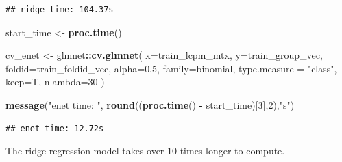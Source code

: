 \documentclass[
]{book}
\newenvironment{Shaded}{\begin{snugshade}}{\end{snugshade}}
\newcommand{\DataTypeTok}[1]{\textcolor[rgb]{0.13,0.29,0.53}{#1}}
\newcommand{\DecValTok}[1]{\textcolor[rgb]{0.00,0.00,0.81}{#1}}
\newcommand{\FloatTok}[1]{\textcolor[rgb]{0.00,0.00,0.81}{#1}}
\newcommand{\KeywordTok}[1]{\textcolor[rgb]{0.13,0.29,0.53}{\textbf{#1}}}
\newcommand{\NormalTok}[1]{#1}
\newcommand{\OperatorTok}[1]{\textcolor[rgb]{0.81,0.36,0.00}{\textbf{#1}}}
\newcommand{\StringTok}[1]{\textcolor[rgb]{0.31,0.60,0.02}{#1}}
\begin{document}
\begin{verbatim}
## ridge time: 104.37s
\end{verbatim}

\begin{Shaded}
\begin{Highlighting}[]
\NormalTok{start\_time <{-}}\StringTok{  }\KeywordTok{proc.time}\NormalTok{()}

\NormalTok{cv\_enet <{-}}\StringTok{ }\NormalTok{glmnet}\OperatorTok{::}\KeywordTok{cv.glmnet}\NormalTok{(}
 \DataTypeTok{x=}\NormalTok{train\_lcpm\_mtx,}
 \DataTypeTok{y=}\NormalTok{train\_group\_vec,}
 \DataTypeTok{foldid=}\NormalTok{train\_foldid\_vec,}
 \DataTypeTok{alpha=}\FloatTok{0.5}\NormalTok{,}
 \DataTypeTok{family=}\StringTok{\textquotesingle{}binomial\textquotesingle{}}\NormalTok{,}
 \DataTypeTok{type.measure =} \StringTok{"class"}\NormalTok{,}
 \DataTypeTok{keep=}\NormalTok{T,}
 \DataTypeTok{nlambda=}\DecValTok{30}
\NormalTok{)}

\KeywordTok{message}\NormalTok{(}\StringTok{"enet time: "}\NormalTok{, }\KeywordTok{round}\NormalTok{((}\KeywordTok{proc.time}\NormalTok{() }\OperatorTok{{-}}\StringTok{ }\NormalTok{start\_time)[}\DecValTok{3}\NormalTok{],}\DecValTok{2}\NormalTok{),}\StringTok{"s"}\NormalTok{)}
\end{Highlighting}
\end{Shaded}

\begin{verbatim}
## enet time: 12.72s
\end{verbatim}

The ridge regression model takes over 10 times longer to compute.
\end{document}

